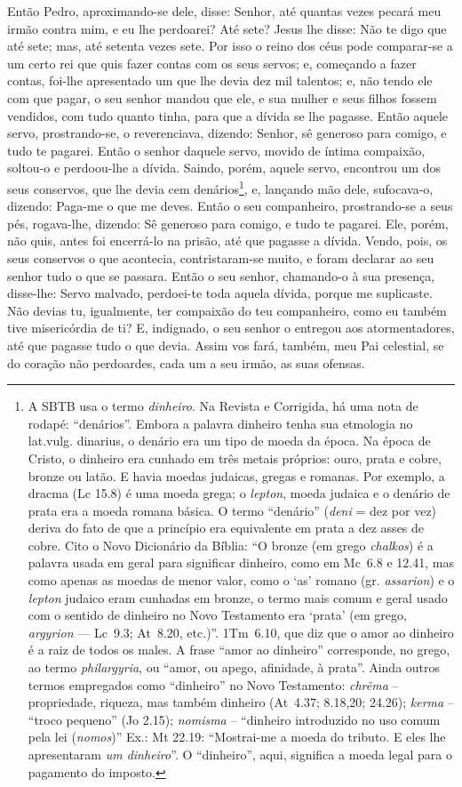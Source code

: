 Então Pedro, aproximando-se dele, disse: Senhor, até quantas
vezes pecará meu irmão contra mim, e eu lhe perdoarei? Até sete?
Jesus lhe disse: Não te digo que até sete; mas, até setenta
vezes sete. Por isso o reino dos céus pode comparar-se a um
certo rei que quis fazer contas com os seus servos; e,
começando a fazer contas, foi-lhe apresentado um que lhe devia dez
mil talentos; e, não tendo ele com que pagar, o seu senhor
mandou que ele, e sua mulher e seus filhos fossem vendidos, com tudo
quanto tinha, para que a dívida se lhe pagasse. Então aquele
servo, prostrando-se, o reverenciava, dizendo: Senhor, sê generoso
para comigo, e tudo te pagarei. Então o senhor daquele servo,
movido de íntima compaixão, soltou-o e perdoou-lhe a dívida.
Saindo, porém, aquele servo, encontrou um dos seus conservos,
que lhe devia cem denários\footnote{A SBTB usa o termo
\emph{dinheiro}.  Na Revista e Corrigida, há uma nota de
rodapé: ``denários''. Embora a palavra dinheiro tenha sua etmologia
no lat.vulg. dinarius, o denário era um tipo de moeda da época. Na
época de Cristo, o dinheiro era cunhado em três metais próprios:
ouro, prata e cobre, bronze ou latão. E havia moedas judaicas,
gregas e romanas. Por exemplo, a dracma (Lc 15.8) é uma moeda grega;
o \emph{lepton}, moeda judaica e o denário de prata era a moeda
romana básica. O termo ``denário'' (\emph{deni} = dez por vez)
deriva do fato de que a princípio era equivalente em prata a dez
asses de cobre. Cito o Novo Dicionário da Bíblia: ``O bronze (em
grego \emph{chalkos}) é a palavra usada em geral para significar
dinheiro, como em Mc~6.8 e 12.41, mas como apenas as moedas de menor
valor, como o `as' romano (gr. \emph{assarion}) e o \emph{lepton}
judaico eram cunhadas em bronze, o termo mais comum e geral usado
com o sentido de dinheiro no Novo Testamento era `prata' (em grego,
\emph{argyrion} --- Lc~9.3; At~8.20, etc.)''. 1Tm~6.10, que diz que o amor ao
dinheiro é a raiz de todos os males. A frase ``amor ao dinheiro''
corresponde, no grego, ao termo \emph{philargyria}, ou ``amor, ou
apego, afinidade, à prata''. Ainda outros termos empregados como
``dinheiro'' no Novo Testamento: \emph{chr\~ema} -- propriedade, riqueza, mas também dinheiro (At~4.37; 8.18,20; 24.26); \emph{kerma} -- ``troco pequeno'' (Jo 2.15);  \emph{nomisma} -- ``dinheiro introduzido no uso comum pela lei (\emph{nomos})'' Ex.: Mt 22.19: ``Mostrai-me a moeda do tributo. E
  eles lhe apresentaram \emph{um dinheiro}''. O ``dinheiro'', aqui,
  significa a moeda legal para o pagamento do imposto.}, e, lançando mão dele, sufocava-o, dizendo: Paga-me o que me deves. Então o seu companheiro, prostrando-se a seus pés, rogava-lhe,
dizendo: Sê generoso para comigo, e tudo te pagarei. Ele,
porém, não quis, antes foi encerrá-lo na prisão, até que pagasse a
dívida. Vendo, pois, os seus conservos o que acontecia,
contristaram-se muito, e foram declarar ao seu senhor tudo o que se
passara. Então o seu senhor, chamando-o à sua presença,
disse-lhe: Servo malvado, perdoei-te toda aquela dívida, porque me
suplicaste. Não devias tu, igualmente, ter compaixão do teu
companheiro, como eu também tive misericórdia de ti? E,
indignado, o seu senhor o entregou aos atormentadores, até que
pagasse tudo o que devia. Assim vos fará, também, meu Pai
celestial, se do coração não perdoardes, cada um a seu irmão, as
suas ofensas.

